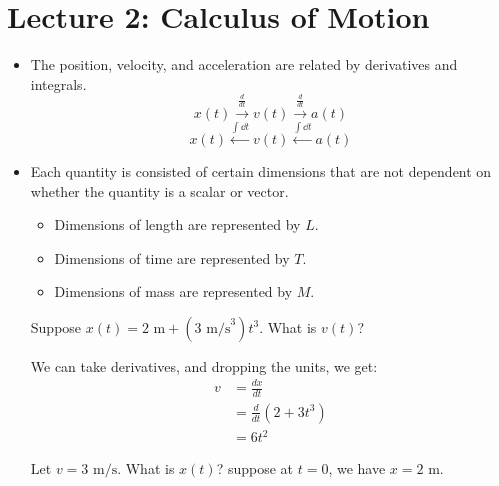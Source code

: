 \section{Lecture 2: Calculus of Motion}
\begin{itemize}
    \item The position, velocity, and acceleration are related by derivatives and integrals.
    \begin{equation}
        x(t) \xrightarrow{\frac{d}{dt}} v(t) \xrightarrow{\frac{d}{dt}} a(t)
        \label{eq:}
    \end{equation}
    \begin{equation}
        x(t) \xleftarrow{\int \dd{t}} v(t) \xleftarrow{\int \dd{t}} a(t)
        \label{eq:}
    \end{equation}

    \item Each quantity is consisted of certain dimensions that are not dependent on whether the quantity is a scalar or vector.
    \begin{itemize}
        \item Dimensions of length are represented by $L$.
        \item Dimensions of time are represented by $T$.
        \item Dimensions of mass are represented by $M$.
    \end{itemize}
    \begin{example}
        Suppose $x(t)=2 \text{ m} + (3 \text{ m/s}^3)t^3$. What is $v(t)$?
        \vspace{2mm}

        We can take derivatives, and dropping the units, we get:
        \begin{align}
            v &= \frac{dx}{dt} \\ 
            &= \frac{d}{dt}(2+3t^3) \\
            &= 6t^2
        \end{align}
    \end{example}
    \begin{example}
        Let $v=3\text{ m/s}$. What is $x(t)$? suppose at $t=0$, we have $x=2 \text{ m}$.
        \vspace{2mm}


\end{example}
\end{itemize}
